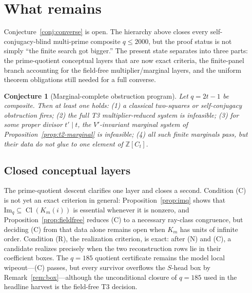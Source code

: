 \documentclass[11pt]{article}
\theoremstyle{plain}
\newtheorem{conjecture}[theorem]{Conjecture}
\theoremstyle{definition}
\theoremstyle{remark}
\newcommand{\Z}{\mathbb Z}
\newcommand{\Cl}{\operatorname{Cl}}
\begin{document}
\section{What remains}\label{sec:remains}

Conjecture~\ref{conj:converse} is open. The hierarchy above closes every
self-conjugacy-blind multi-prime composite $q\le2000$, but the proof status is
not simply ``the finite search got bigger.''  The present state separates into
three parts: the prime-quotient conceptual layers that are now exact criteria,
the finite-panel branch accounting for the field-free multiplier/marginal
layers, and the uniform theorem obligations still needed for a full converse.

\begin{conjecture}[Marginal-complete obstruction program]\label{conj:program}
Let $q=2t-1$ be composite. Then at least one holds: \emph{(1)} a classical
two-squares or self-conjugacy obstruction fires; \emph{(2)} the full T3
multiplier-reduced system is infeasible; \emph{(3)} for some proper divisor
$t'\mid t$, the $V'$-invariant marginal system of
Proposition~\ref{prop:t2-marginal} is infeasible; \emph{(4)} all such finite
marginals pass, but their data do not glue to one element of $\Z[C_t]$.
\end{conjecture}

\subsection{Closed conceptual layers}\label{sec:closed-conceptual-layers}

The prime-quotient descent clarifies one layer and closes a second. Condition
(C) is not yet an exact criterion in general: Proposition~\ref{prop:imq} shows
that $\mathrm{Im}_q\subseteq\Cl(K_m(i))$ is essential whenever it is nonzero,
and Proposition~\ref{prop:fieldfree} reduces (C) to a necessary ray-class
congruence, but deciding (C) from that data alone remains open when $K_m$ has
units of infinite order. Condition (R), the realization criterion, is exact:
after (N) and (C), a candidate realizes precisely when the two reconstruction
rows lie in their coefficient boxes. The $q=185$ quotient certificate remains
the model local wipeout---(C) passes, but every survivor overflows the
$S$-head box by Remark~\ref{rem:box}---although the unconditional closure of
$q=185$ used in the headline harvest is the field-free T3 decision.
\end{document}
